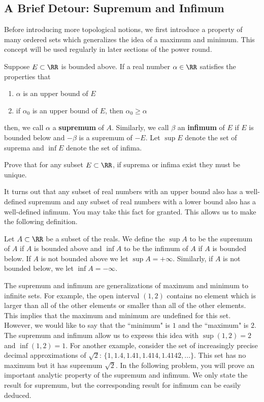 \documentclass[11pt]{article}
\begin{document}
    \subsection{A Brief Detour: Supremum and Infimum}
    Before introducing more topological notions, we first introduce a property of many ordered sets which generalizes the idea of a maximum and minimum. This concept will be used regularly in later sections of the power round. 
    \begin{defn}\label{defn-supremum}
        Suppose $E \subset \RR$ is bounded above. If a real number $\alpha \in \RR$ satisfies the properties that 
        \begin{enumerate}[label = (\roman*)]
            \item $\alpha$ is an upper bound of $E$
            \item if $\alpha_0$ is an upper bound of $E$, then $\alpha_0 \geq \alpha$
        \end{enumerate}
        then, we call $\alpha$ a \textbf{supremum} of $A$. Similarly, we call $\beta$ an \textbf{infimum} of $E$ if $E$ is bounded below and $-\beta$ is a supremum of $-E$. Let $\sup E$ denote the set of suprema and $\inf E$ denote the set of infima. 
    \end{defn}

    \begin{prob} [5 points]
        Prove that for any subset $E \subset \RR$, if suprema or infima exist they must be unique. 
    \end{prob}

    It turns out that any subset of real numbers with an upper bound also has a well-defined supremum and any subset of real numbers with a lower bound also has a well-defined infimum. You may take this fact for granted. This allows us to make the following definition. 

    \begin{defn}
        Let $A \subset \RR$ be a subset of the reals. We define the $\sup A$ to be the supremum of $A$ if $A$ is bounded above and $\inf A$ to be the infimum of $A$ if $A$ is bounded below. If $A$ is not bounded above we let $\sup A = +\infty$. Similarly, if $A$ is not bounded below, we let $\inf A = -\infty$.   
    \end{defn}

    The supremum and infimum are generalizations of maximum and minimum to infinite sets. For example, the open interval $(1, 2)$ contains no element which is larger than all of the other elements or smaller than all of the other elements. This implies that the maximum and minimum are undefined for this set. However, we would like to say that the ``minimum" is $1$ and the ``maximum" is $2$. The supremum and infimum allow us to express this idea with $\sup (1, 2) = 2$ and $\inf (1, 2) = 1$. For another example, consider the set of increasingly precise decimal approximations of $\sqrt{2}$: $\{1, 1.4, 1.41, 1.414, 1.4142, ... \}$. This set has no maximum but it has supremum $\sqrt{2}$. In the following problem, you will prove an important analytic property of the supremum and infimum. We only state the result for supremum, but the corresponding result for infimum can be easily deduced. 
\end{document}
